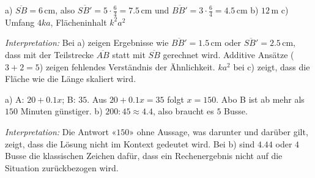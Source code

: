 \documentclass[11pt]{exam}
\newcommand{\aufgabe}[1]{%
  \needspace{8\baselineskip}%
  \renewcommand{\questionlabel}{\textbf{#1}}%
  \question}
\newcommand{\geteilt}{\mathbin{:}}
\newcommand{\raum}[1]{\ifprintanswers\else\fillwithgrid{#1}\fi}
\newcommand{\diagnose}[1]{\par\smallskip\textit{Interpretation:} #1}
\begin{document}
\begin{questions}
\begin{solution}
  a) $\overline{SB} = 6$\,cm, also $\overline{SB'} = 5 \cdot \frac{6}{4} =
  7.5$\,cm und $\overline{BB'} = 3 \cdot \frac{6}{4} = 4.5$\,cm \quad
  b) $12$\,m \quad
  c) Umfang $4ka$, Flächeninhalt $k^2a^2$
  \diagnose{Bei a) zeigen Ergebnisse wie $\overline{BB'} = 1.5$\,cm oder
  $\overline{SB'} = 2.5$\,cm, dass mit der Teilstrecke $\overline{AB}$ statt
  mit $\overline{SB}$ gerechnet wird. Additive Ansätze ($3 + 2 = 5$) zeigen
  fehlendes Verständnis der Ähnlichkeit. $ka^2$ bei c) zeigt, dass die Fläche
  wie die Länge skaliert wird.}
\end{solution}
\raum{4cm}

\aufgabe{9.6}
\begin{solution}
  a) A: $20 + 0.1x$; B: $35$. Aus $20 + 0.1x = 35$ folgt $x = 150$. Abo B ist
  ab mehr als $150$ Minuten günstiger. \quad
  b) $200 \geteilt 45 \approx 4.4$, also braucht es $5$ Busse.
  \diagnose{Die Antwort «$150$» ohne Aussage, was darunter und darüber gilt,
  zeigt, dass die Lösung nicht im Kontext gedeutet wird. Bei b) sind $4.44$
  oder $4$ Busse die klassischen Zeichen dafür, dass ein Rechenergebnis nicht
  auf die Situation zurückbezogen wird.}
\end{solution}
\raum{4.5cm}


\end{questions}
\end{document}
